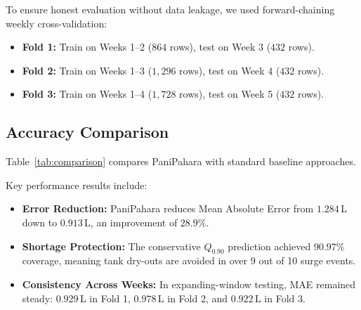 \documentclass[conference]{IEEEtran}
\begin{document}
To ensure honest evaluation without data leakage, we used forward-chaining weekly cross-validation:
\begin{itemize}
    \item \textbf{Fold 1:} Train on Weeks 1--2 ($864$ rows), test on Week 3 ($432$ rows).
    \item \textbf{Fold 2:} Train on Weeks 1--3 ($1,296$ rows), test on Week 4 ($432$ rows).
    \item \textbf{Fold 3:} Train on Weeks 1--4 ($1,728$ rows), test on Week 5 ($432$ rows).
\end{itemize}

\subsection{Accuracy Comparison}
Table~\ref{tab:comparison} compares PaniPahara with standard baseline approaches.

\begin{table}[!t]
\centering
\caption{Model Performance Comparison on Calibrated Benchmark}
\label{tab:comparison}
\end{table}

Key performance results include:
\begin{itemize}
    \item \textbf{Error Reduction:} PaniPahara reduces Mean Absolute Error from $1.284$\,L down to $0.913$\,L, an improvement of \textbf{$28.9\%$}.
    \item \textbf{Shortage Protection:} The conservative $Q_{0.90}$ prediction achieved \textbf{$90.97\%$} coverage, meaning tank dry-outs are avoided in over 9 out of 10 surge events.
    \item \textbf{Consistency Across Weeks:} In expanding-window testing, MAE remained steady: $0.929$\,L in Fold 1, $0.978$\,L in Fold 2, and $0.922$\,L in Fold 3.
\end{itemize}
\end{document}

